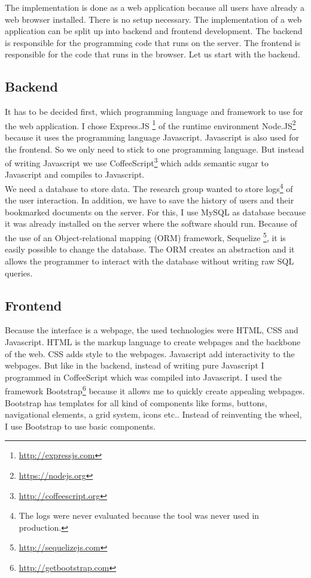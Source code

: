 \documentclass[11pt]{report}
\begin{document}
The implementation is done as a web application because all users have already a web browser installed. There is no setup necessary. The implementation of a web application can be split up into backend and frontend development. The backend is responsible for the programming code that runs on the server. The frontend is responsible for the code that runs in the browser. Let us start with the backend.

\subsection{Backend}

It has to be decided first, which programming language and framework to use for the web application. I chose Express.JS \footnote{\url{http://expressjs.com}} of the runtime environment Node.JS\footnote{\url{https://nodejs.org}} because it uses the programming language Javascript. Javascript is also used for the frontend. So we only need to stick to one programming language. But instead of writing Javascript we use CoffeeScript\footnote{\url{http://coffeescript.org}} which adds semantic sugar to Javascript and compiles to Javascript.\\

We need a database to store data. The research group wanted to store logs\footnote{The logs were never evaluated because the tool was never used in production.} of the user interaction. In addition, we have to save the history of users and their bookmarked documents on the server. For this, I use MySQL as database because it was already installed on the server where the software should run. Because of the use of an Object-relational mapping (ORM) framework, Sequelize \footnote{\url{http://sequelizejs.com}}, it is easily possible to change the database. The ORM creates an abstraction and it allows the programmer to interact with the database without writing raw SQL queries.

\subsection{Frontend}

Because the interface is a webpage, the used technologies were HTML, CSS and Javascript. HTML is the markup language to create webpages and the backbone of the web. CSS adds style to the webpages. Javascript add interactivity to the webpages. But like in the backend, instead of writing pure Javascript I programmed in CoffeeScript which was compiled into Javascript. I used the framework Bootstrap\footnote{\url{http://getbootstrap.com}} because it allows me to quickly create appealing webpages. Bootstrap has templates for all kind of components like forms, buttons, navigational elements, a grid system, icons etc.. Instead of reinventing the wheel, I use Bootstrap to use basic components.\\
\end{document}
